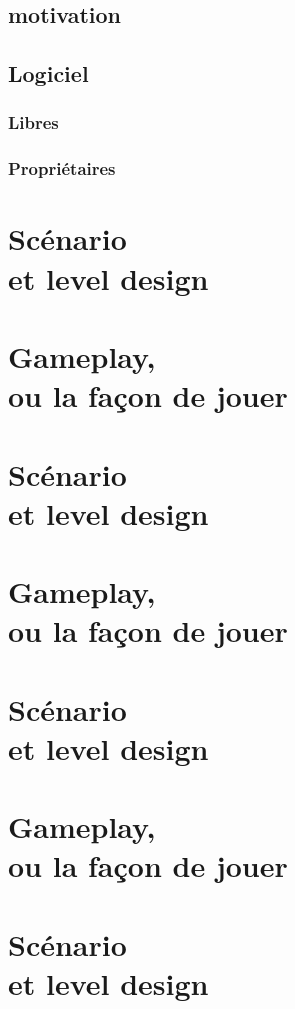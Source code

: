 \documentclass[a4paper, 10pt, oneside, fleqn]{report}
\begin{document}
	\section{motivation}
	\section{Logiciel}
	\subsection{Libres}
	\subsection{Propriétaires}
	
	\chapter[Scénarioet level design]{Scénario\\et level design}	
	
	\chapter[Gameplay, ou la façon de jouer]{Gameplay,\\ou la façon de jouer}
	
	\chapter[Scénario et level design]{Scénario\\et level design}
	
	\chapter[Gameplay, ou la façon de jouer]{Gameplay,\\ou la façon de jouer}
	
	\chapter[Scénario et level design]{Scénario\\et level design}
	
	\chapter[Gameplay, ou la façon de jouer]{Gameplay,\\ou la façon de jouer}
	
	\chapter[Scénario et level design]{Scénario\\et level design} 
	
\end{document}
